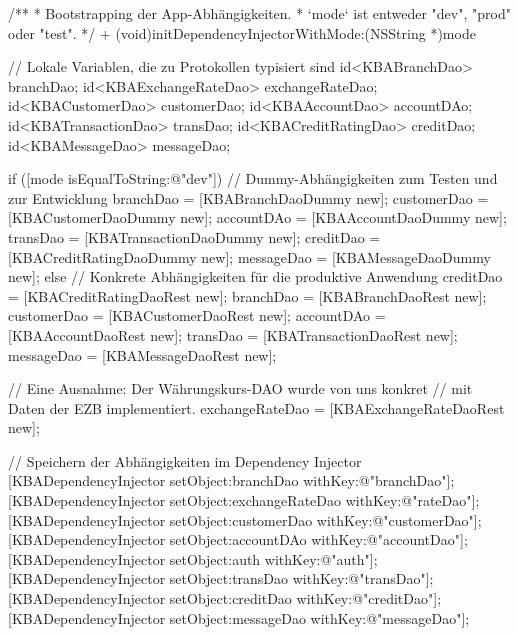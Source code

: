 /**
 * Bootstrapping der App-Abhängigkeiten.
 * `mode` ist entweder "dev", "prod" oder "test".
 */
+ (void)initDependencyInjectorWithMode:(NSString *)mode {
	// Lokale Variablen, die zu Protokollen typisiert sind
	id<KBABranchDao> branchDao;
	id<KBAExchangeRateDao> exchangeRateDao;
	id<KBACustomerDao> customerDao;
	id<KBAAccountDao> accountDAo;
	id<KBATransactionDao> transDao;
	id<KBACreditRatingDao> creditDao;
	id<KBAMessageDao> messageDao;
    
    if ([mode isEqualToString:@"dev"]) { 
		// Dummy-Abhängigkeiten zum Testen und zur Entwicklung
		branchDao   = [KBABranchDaoDummy new];
		customerDao = [KBACustomerDaoDummy new];
		accountDAo  = [KBAAccountDaoDummy new];
		transDao    = [KBATransactionDaoDummy new];
		creditDao   = [KBACreditRatingDaoDummy new];
		messageDao  = [KBAMessageDaoDummy new];
    }
    else {
		// Konkrete Abhängigkeiten für die produktive Anwendung
		creditDao   = [KBACreditRatingDaoRest new];
		branchDao   = [KBABranchDaoRest new];
		customerDao = [KBACustomerDaoRest new];
		accountDAo  = [KBAAccountDaoRest new];
		transDao    = [KBATransactionDaoRest new];
		messageDao  = [KBAMessageDaoRest new];
	}
	
	// Eine Ausnahme: Der Währungskurs-DAO wurde von uns konkret
	// mit Daten der EZB implementiert.
	exchangeRateDao = [KBAExchangeRateDaoRest new];
    
    // Speichern der Abhängigkeiten im Dependency Injector
    [KBADependencyInjector setObject:branchDao withKey:@"branchDao"];
    [KBADependencyInjector setObject:exchangeRateDao withKey:@"rateDao"];
    [KBADependencyInjector setObject:customerDao withKey:@"customerDao"];
    [KBADependencyInjector setObject:accountDAo withKey:@"accountDao"];
    [KBADependencyInjector setObject:auth withKey:@"auth"];
    [KBADependencyInjector setObject:transDao withKey:@"transDao"];
    [KBADependencyInjector setObject:creditDao withKey:@"creditDao"];
    [KBADependencyInjector setObject:messageDao withKey:@"messageDao"];   
}